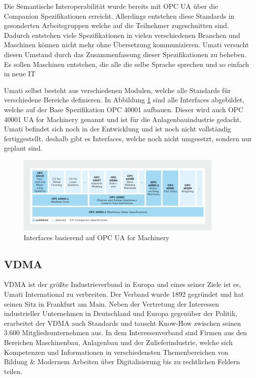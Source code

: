 \documentclass[a4paper, 12pt, oneside]{scrbook}
\begin{document}
		Die Semantische Interoperabilität wurde bereits mit OPC UA über die Companion Spezifikationen erreicht. Allerdings entstehen diese Standards in gesonderten Arbeitsgruppen welche auf die Teilnehmer zugeschnitten sind. Dadurch entstehen viele Spezifikationen in vielen verschiedenen Branchen und Maschinen können nicht mehr ohne Übersetzung kommunizieren. Umati versucht diesen Umstand durch das Zusammenfassung dieser Spezifikationen zu beheben. Es sollen Maschinen entstehen, die alle die selbe Sprache sprechen und so einfach in neue IT 
		
		Umati selbst besteht aus verschiedenen Modulen, welche alle Standards für verschiedene Bereiche definieren. In Abbildung \ref{fig:OPCUA_for_machinery} sind alle Interfaces abgebildet, welche auf der Base Spezifikation OPC 40001 aufbauen. Dieser wird auch OPC 40001 UA for Machinery genannt und ist für die Anlagenbauindustrie gedacht. Umati befindet sich noch in der Entwicklung und ist noch nicht vollständig fertiggestellt, deshalb gibt es Interfaces, welche noch nicht umgesetzt, sondern nur geplant sind. \cite{noauthor_machinery_nodate}
		
		\begin{figure}[H]
			\centering
			\includegraphics[width=0.9\textwidth]{res/diagramms/OPCUA_for_machinery.png}
			\caption{Interfaces basierend auf OPC UA for Machinery \cite{noauthor_machinery_nodate}} 
			\label{fig:OPCUA_for_machinery}
		\end{figure}
		
		
		\subsection{VDMA}
		
		\ac{VDMA} ist der größte Industrieverbund in Europa und eines seiner Ziele ist es, Umati International zu verbreiten. Der Verband wurde 1892 gegründet und hat seinen Sitz in Frankfurt am Main. Neben der Vertretung der Interessen industrieller Unternehmen in Deutschland und Europa gegenüber der Politik, erarbeitet der VDMA auch Standards und tauscht Know-How zwischen seinen 3.600 Mitgliedsunternehmen aus. \cite{noauthor_verband_nodate} In dem Interessenverband sind Firmen aus den Bereichen Maschinenbau, Anlagenbau und der Zulieferindustrie, welche sich Kompetenzen und Informationen in verschiedensten Themenbereichen von Bildung \& Modernem Arbeiten über Digitalisierung bis zu rechtlichen Feldern teilen. \cite{noauthor_themenubersicht_nodate}
		
\end{document}
